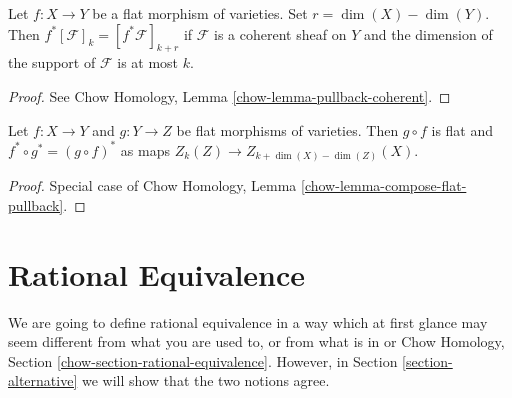 \begin{lemma}
\label{lemma-pullback}
Let $f : X \to Y$ be a flat morphism of varieties. Set $r = \dim(X) - \dim(Y)$.
Then $f^*[\mathcal{F}]_k = [f^*\mathcal{F}]_{k + r}$
if $\mathcal{F}$ is a coherent sheaf on $Y$ and the dimension of the
support of $\mathcal{F}$ is at most $k$.
\end{lemma}

\begin{proof}
See Chow Homology, Lemma \ref{chow-lemma-pullback-coherent}.
\end{proof}

\begin{lemma}
\label{lemma-compose-flat-pullback}
Let $f : X \to Y$ and $g : Y \to Z$ be flat morphisms of
varieties. Then $g \circ f$ is flat and $f^* \circ g^* = (g \circ f)^*$
as maps $Z_k(Z) \to Z_{k + \dim(X) - \dim(Z)}(X)$.
\end{lemma}

\begin{proof}
Special case of Chow Homology, Lemma \ref{chow-lemma-compose-flat-pullback}.
\end{proof}


\section{Rational Equivalence}
\label{section-rational-equivalence}

\noindent
We are going to define rational equivalence in a way which at first
glance may seem different from what you are used to, or from what
is in \cite[Chapter I]{F} or
Chow Homology, Section \ref{chow-section-rational-equivalence}.
However, in Section \ref{section-alternative} we will show that
the two notions agree.

